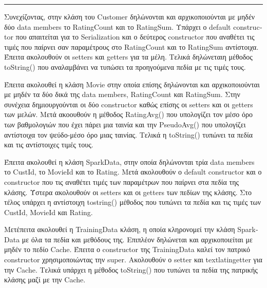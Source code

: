 \documentclass{report}
\begin{document}
\rule{17cm}{0.1cm}


Συνεχίζοντας, στην κλάση του \textlatin{Customer} δηλώνονται και αρχικοποιούνται με μηδέν δύο \textlatin{data members} το \textlatin{RatingCount} και το \textlatin{RatingSum}. Υπάρχει ο \textlatin{default constructor} που απαιτείται για το \textlatin{Serialization} και ο δεύτερος \textlatin{constructor} που αναθέτει τις τιμές που παίρνει σαν παραμέτρους στο \textlatin{RatingCount} και το \textlatin{RatingSum} αντίστοιχα. Έπειτα ακολουθούν οι \textlatin{setters} και \textlatin{getters} για τα μέλη. Τελικά δηλώνεταιη μέθοδος \textlatin{toString}() που αναλαμβάνει να τυπώσει τα προηγούμενα πεδία με τις τιμές τους. 


Έπειτα ακολουθεί η κλάση \textlatin{Movie} στην οποία επίσης δηλώνονται και αρχικοποιούνται με μηδέν τα δύο δικά της \textlatin{data members}, \textlatin{RatingCount} και \textlatin{RatingSum}. Στην συνέχεια δημιουργούνται οι δύο constructor καθώς επίσης οι \textlatin{setters} και οι \textlatin{getters} των μελών. Μετά ακοουθούν η μέθοδος \textlatin{RatingAvg}() που υπολογίζει τον μέσο όρο των βαθμολογιών που έχει πάρει μια ταινία και την \textlatin{PseudoAvg}() που υπολογίζει αντίστοιχα τον ψεύδο-μέσο όρο μιας ταινίας. Τελικά η \textlatin{toString}() τυπώνει τα πεδία και τις αντίστοιχες τιμές τους.



Έπειτα ακολουθεί η κλάση \textlatin{SparkData}, στην οποία δηλώνονται τρία \textlatin{data members} το \textlatin{CustId}, το \textlatin{MovieId} και το \textlatin{Rating}. Μετά ακολουθούν ο \textlatin{default constructor} και ο \textlatin{constructor} που τις αναθέτει τιμές των παραμέτρων που παίρνει στα πεδία της κλάσης. Ύστερα ακολουθούν οι \textlatin{setters} και οι \textlatin{getters}  των πεδίων της κλάσης. Στο τέλος υπάρχει η αντίστοιχη \textlatin{tostring}() μέθοδος που τυπώνει τα πεδία και τις τιμές των \textlatin{CustId, MovieId} και \textlatin{Rating}.



Μετέπειτα ακολουθεί η \textlatin{TrainingData} κλάση, η οποία κληρονομεί την
κλάση \textlatin{SparkData} με όλα τα πεδία και μεθόδους της. Επιπλέον δηλώνεται
και αρχικοποιείται με μηδέν το πεδίο \textlatin{Cache}. Έπειτα ο \textlatin{constructor} της \textlatin{TrainingData}  καλεί τον πατρικό \textlatin{constructor} χρησιμοποιώντας την \textlatin{super}. Ακολουθούν ο \textlatin{setter} και textlatin{getter} για την \textlatin{Cache}. Τελικά υπάρχει η μέθοδος \textlatin{toString}() που τυπώνει τα πεδία της πατρικής κλάσης μαζί με την \textlatin{Cache}.
\end{document}
